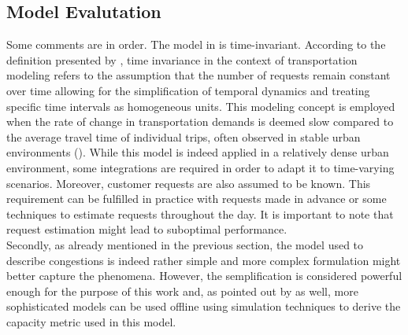 \subsection{Model Evalutation}\label{sec:mode_evaluation_ats}
Some comments are in order. The model in  is time-invariant. According to the definition presented by , time invariance in the context of transportation modeling refers to the assumption that the number of requests remain constant over time allowing for the simplification of temporal dynamics and treating specific time intervals as homogeneous units. This modeling concept is employed when the rate of change in transportation demands is deemed slow compared to the average travel time of individual trips, often observed in stable urban environments (\cite{neuburger1971}). While this model is indeed applied in a relatively dense urban environment, some integrations are required in order to adapt it to time-varying scenarios. Moreover, customer requests are also assumed to be known. This requirement can be fulfilled in practice with requests made in advance or some techniques to estimate requests throughout the day. It is important to note that request estimation might lead to suboptimal performance. \\
Secondly, as already mentioned in the previous section, the model used to describe congestions is indeed rather simple and more complex formulation might better capture the phenomena. However, the semplification is considered powerful enough for the purpose of this work and, as pointed out by  as well, more sophisticated models can be used offline using simulation techniques to derive the capacity metric used in this model.\\
